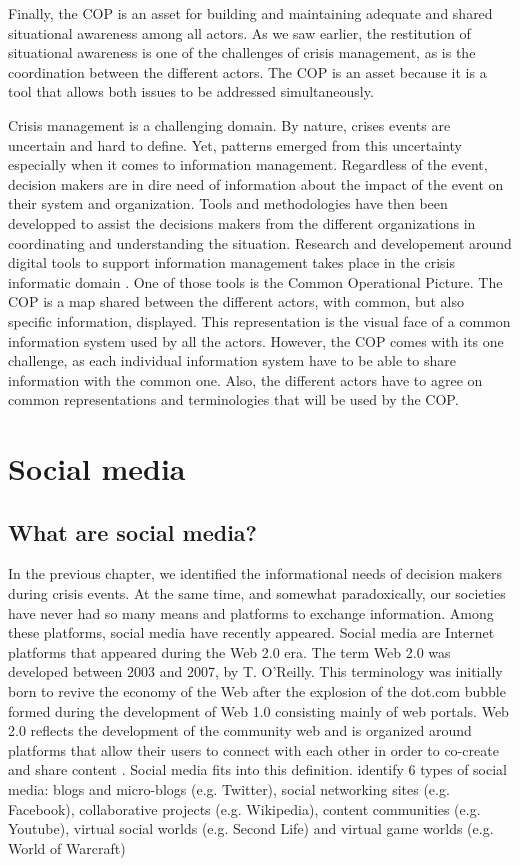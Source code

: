 Finally, the COP is an asset for building and maintaining adequate and shared situational awareness among all actors.
As we saw earlier, the restitution of situational awareness is one of the challenges of crisis management, as is the coordination between the different actors.
The COP is an asset because it is a tool that allows both issues to be addressed simultaneously.

Crisis management is a challenging domain.
By nature, crises events are uncertain and hard to define.
Yet, patterns emerged from this uncertainty especially when it comes to information management.
Regardless of the event, decision makers are in dire need of information about the impact of the event on their system and organization.
Tools and methodologies have then been developped to assist the decisions makers from the different organizations in coordinating and understanding the situation.
Research and developement around digital tools to support information management takes place in the crisis informatic domain \cite{palenCrisisInformaticsHumancentered2020}.
One of those tools is the Common Operational Picture.
The COP is a map shared between the different actors, with common, but also specific information, displayed.
This representation is the visual face of a common information system used by all the actors.
However, the COP comes with its one challenge, as each individual information system have to be able to share information with the common one.
Also, the different actors have to agree on common representations and terminologies that will be used by the COP.

\section{Social media}
\subsection{What are social media?}
In the previous chapter, we identified the informational needs of decision makers during crisis events.
At the same time, and somewhat paradoxically, our societies have never had so many means and platforms to exchange information.
Among these platforms, social media have recently appeared.
Social media are Internet platforms that appeared during the Web 2.0 era.
The term Web 2.0 was developed between 2003 and 2007, by T. O'Reilly.
This terminology was initially born to revive the economy of the Web after the explosion of the dot.com bubble formed during the development of Web 1.0 consisting mainly of web portals.
Web 2.0 reflects the development of the community web and is organized around platforms that allow their users to connect with each other in order to co-create and share content \cite{oreillyWhatWebDesign2007b}.
Social media fits into this definition.
\cite{kaplanUsersWorldUnite2010a} identify 6 types of social media: blogs and micro-blogs (e.g. Twitter), social networking sites (e.g. Facebook), collaborative projects (e.g. Wikipedia), content communities (e.g. Youtube), virtual social worlds (e.g. Second Life) and virtual game worlds (e.g. World of Warcraft)


